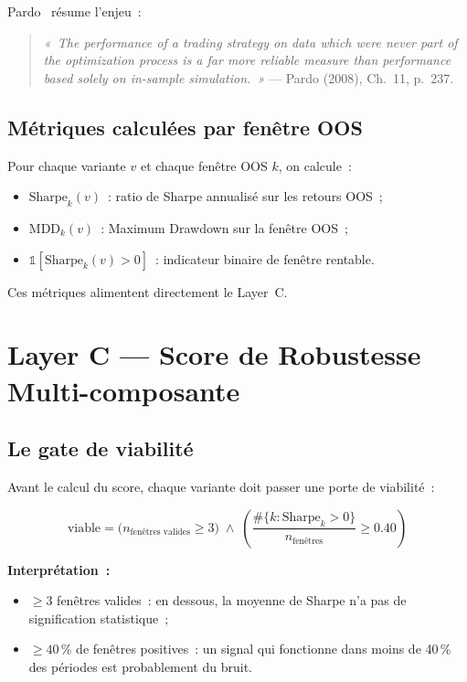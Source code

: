 Pardo~\cite{pardo2008} résume l'enjeu~:

\begin{quote}
\textit{«~The performance of a trading strategy on data which were never part of the
optimization process is a far more reliable measure than performance based solely
on in-sample simulation.~»} — Pardo (2008), Ch.~11, p.~237.
\end{quote}

\subsection{Métriques calculées par fenêtre OOS}

Pour chaque variante $v$ et chaque fenêtre OOS $k$, on calcule~:

\begin{itemize}
    \item $\text{Sharpe}_k(v)$~: ratio de Sharpe annualisé sur les retours OOS~;
    \item $\text{MDD}_k(v)$~: Maximum Drawdown sur la fenêtre OOS~;
    \item $\mathbb{1}[\text{Sharpe}_k(v) > 0]$~: indicateur binaire de fenêtre
    rentable.
\end{itemize}

Ces métriques alimentent directement le Layer~C.

\section{Layer C --- Score de Robustesse Multi-composante}
\label{sec:layer_c}

\subsection{Le gate de viabilité}

Avant le calcul du score, chaque variante doit passer une porte de viabilité~:

\begin{equation}
\text{viable} =
\bigl(n_{\text{fenêtres valides}} \geq 3\bigr)
\;\wedge\;
\left(\frac{\#\{k : \text{Sharpe}_k > 0\}}{n_{\text{fenêtres}}} \geq 0.40\right)
\label{eq:viability_gate}
\end{equation}

\textbf{Interprétation~:}
\begin{itemize}
    \item $\geq 3$ fenêtres valides~: en dessous, la moyenne de Sharpe n'a pas de
    signification statistique~;
    \item $\geq 40\,\%$ de fenêtres positives~: un signal qui fonctionne dans moins
    de 40\,\% des périodes est probablement du bruit.
\end{itemize}

